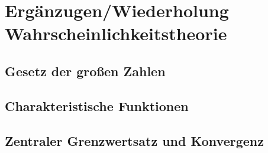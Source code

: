 
\newpage
\section{Ergänzugen/Wiederholung Wahrscheinlichkeitstheorie}

\subsection{Gesetz der großen Zahlen}

\subsection{Charakteristische Funktionen}

\subsection{Zentraler Grenzwertsatz und Konvergenz}